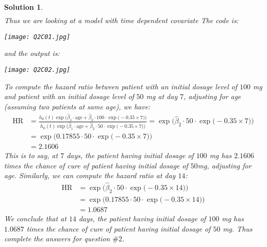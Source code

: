 \documentclass[11pt]{article}
\newtheorem{sol}{Solution}
\begin{document}
\begin{sol}
\begin{align*}
	\end{align*}
	Thus we are looking at a model with time dependent covariate
	\vskip 2mm
	The code is:
	\begin{center}
		\texttt{[image: Q2C01.jpg]}
	\end{center}
	and the output is:
	\begin{center}
		\texttt{[image: Q2C02.jpg]}
	\end{center}
	To compute the hazard ratio between patient with an initial dosage level of $100$ mg and patient with an initial dosage level of $50$ mg at day $7$, adjusting for age (assuming two patients at same age), we have:
	\begin{align*}
		\text{HR} &= \frac{h_0(t)\exp\Big(\hat{\beta}_1\cdot \text{age} + \hat{\beta}_2\cdot 100\cdot \exp\Big(-0.35\times 7\Big)\Big)}{h_0(t)\exp\Big(\hat{\beta}_1\cdot \text{age} + \hat{\beta}_2\cdot 50\cdot \exp\Big(-0.35\times 7\Big)\Big)} = \exp\Big(\hat{\beta}_2\cdot 50\cdot \exp\Big(-0.35\times 7\Big)\Big)\\
		&= \exp\Big(0.17855\cdot 50\cdot \exp\Big(-0.35\times 7\Big)\Big)\\
		&= 2.1606
	\end{align*}
	This is to say, at $7$ days, the patient having initial dosage of $100$ mg has $2.1606$ times the chance of cure of patient having initial dosage of $50$mg, adjusting for age.\vskip 2mm
	Similarly, we can compute the hazard ratio at day $14$:
	\begin{align*}
		\text{HR} &= \exp\Big(\hat{\beta}_2\cdot 50\cdot \exp\Big(-0.35\times 14\Big)\Big)\\
		&= \exp\Big(0.17855\cdot 50\cdot \exp\Big(-0.35\times 14\Big)\Big)\\
		&= 1.0687
	\end{align*}
	We conclude that at $14$ days, the patient having initial dosage of $100$ mg has $1.0687$ times the chance of cure of patient having initial dosage of $50$ mg.
	\vskip 2mm
	Thus complete the answers for question $\# 2$.
\end{sol}
\end{document}
